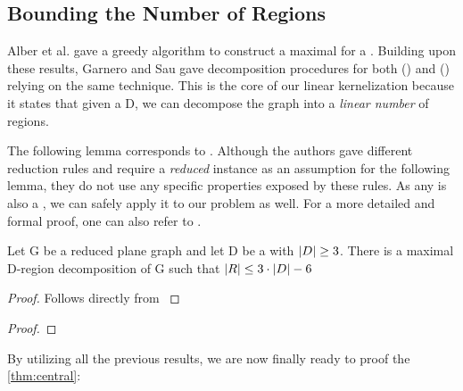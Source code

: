 \subsection{Bounding the Number of Regions}

Alber et al. \cite[Proposition 1]{Alber2004} gave a greedy algorithm to construct a maximal \dreg for a \dom. Building upon these results, Garnero and Sau gave decomposition procedures for both \rbdom (\cite{Garnero2017}) and \tdom (\cite{Garnero2018}) relying on the same technique. This is the core of our linear kernelization because it states that given a \dom D, we can decompose the graph into a \textit{linear number} of regions.


The following lemma corresponds to \cite[Proposition 1 and Lemma 5]{Alber2004}. Although the authors gave different reduction rules and require a \textit{reduced} instance as an assumption for the following lemma, they do not use any specific properties exposed by these rules. 
As any \sdom is also a \dom, we can safely apply it to our problem as well. For a more detailed and formal proof, one can also refer to \cite[Proposition 1]{Garnero2018}.

\begin{lemma}\label{lemma:numRegions}
    Let G be a reduced plane graph and let D be a \sdom with $\abs{D}\geq 3$. There is a maximal D-region decomposition of G such that $\abs{R} \leq 3 \cdot \abs{D} - 6$
\end{lemma}
\begin{proof} 
    Follows directly from \cite[Proposition 1 and Lemma 5]{Alber2004}
\end{proof}


\begin{lemma}\label{lemma:runtime}
\end{lemma}
\begin{proof} 
\end{proof}

\noindent By utilizing all the previous results, we are now finally ready to proof the \cref{thm:central}: 

\centraltheo*

